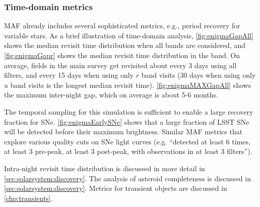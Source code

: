 \subsubsection{Time-domain metrics}

MAF already includes
several sophisticated metrics, e.g., period recovery for variable
stars.  As a brief illustration of time-domain analysis,
\autoref{fig:enigmaGapAll} shows the median revisit time distribution
when all bands are considered, and \autoref{fig:enigmaGapr} shows the
median revisit time distribution in the band.  On average, fields in
the main survey get revisited about every 3 days using all filters,
and every 15 days when using only $r$ band visits (30 days when using
only $u$ band visits is the longest median revisit time).
\autoref{fig:enigmaMAXGapAll} shows the maximum inter-night gap, which
on average is about 5-6 months.

The temporal sampling for this simulation is sufficient to enable a
large recovery fraction for SNe. \autoref{fig:enigmaEarlySNe} shows
that a large fraction of LSST SNe will be detected before their
maximum brightness. Similar MAF metrics that explore various quality
cuts on SNe light curves (e.g. ``detected at least 6 times, at least 3
pre-peak, at least 3 post-peak, with observations in at least 3
filters'').

Intra-night revisit time distribution is discussed in more detail in
\autoref{sec:solarsystem:discovery}. The analysis of asteroid completeness is
discussed in \autoref{sec:solarsystem:discovery}. Metrics for transient objects
are discussed in \autoref{chp:transients}.



